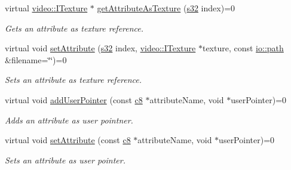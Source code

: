 \begin{DoxyCompactItemize}
virtual \hyperlink{classirr_1_1video_1_1ITexture}{video\+::\+I\+Texture} $\ast$ \hyperlink{classirr_1_1io_1_1IAttributes_ad022db880ccf7844c720efceef7c22fc}{get\+Attribute\+As\+Texture} (\hyperlink{namespaceirr_ac66849b7a6ed16e30ebede579f9b47c6}{s32} index)=0
\begin{DoxyCompactList}\small\item\em Gets an attribute as texture reference. \end{DoxyCompactList}\item 
\mbox{\label{classirr_1_1io_1_1IAttributes_a31db1888f86c81f35caab8414ef8dcfc}} 
virtual void \hyperlink{classirr_1_1io_1_1IAttributes_a31db1888f86c81f35caab8414ef8dcfc}{set\+Attribute} (\hyperlink{namespaceirr_ac66849b7a6ed16e30ebede579f9b47c6}{s32} index, \hyperlink{classirr_1_1video_1_1ITexture}{video\+::\+I\+Texture} $\ast$texture, const \hyperlink{namespaceirr_1_1io_a6468281622ce3a1c46b72e19f32dded5}{io\+::path} \&filename=\char`\"{}\char`\"{})=0
\begin{DoxyCompactList}\small\item\em Sets an attribute as texture reference. \end{DoxyCompactList}\item 
\mbox{\label{classirr_1_1io_1_1IAttributes_a04717eae75a539cd87ea057bf0444db2}} 
virtual void \hyperlink{classirr_1_1io_1_1IAttributes_a04717eae75a539cd87ea057bf0444db2}{add\+User\+Pointer} (const \hyperlink{namespaceirr_a9395eaea339bcb546b319e9c96bf7410}{c8} $\ast$attribute\+Name, void $\ast$user\+Pointer)=0
\begin{DoxyCompactList}\small\item\em Adds an attribute as user pointner. \end{DoxyCompactList}\item 
\mbox{\label{classirr_1_1io_1_1IAttributes_a558e6bb8c92226e99cd5b858db1b3ea8}} 
virtual void \hyperlink{classirr_1_1io_1_1IAttributes_a558e6bb8c92226e99cd5b858db1b3ea8}{set\+Attribute} (const \hyperlink{namespaceirr_a9395eaea339bcb546b319e9c96bf7410}{c8} $\ast$attribute\+Name, void $\ast$user\+Pointer)=0
\begin{DoxyCompactList}\small\item\em Sets an attribute as user pointer. \end{DoxyCompactList}\item 

\end{DoxyCompactItemize}
